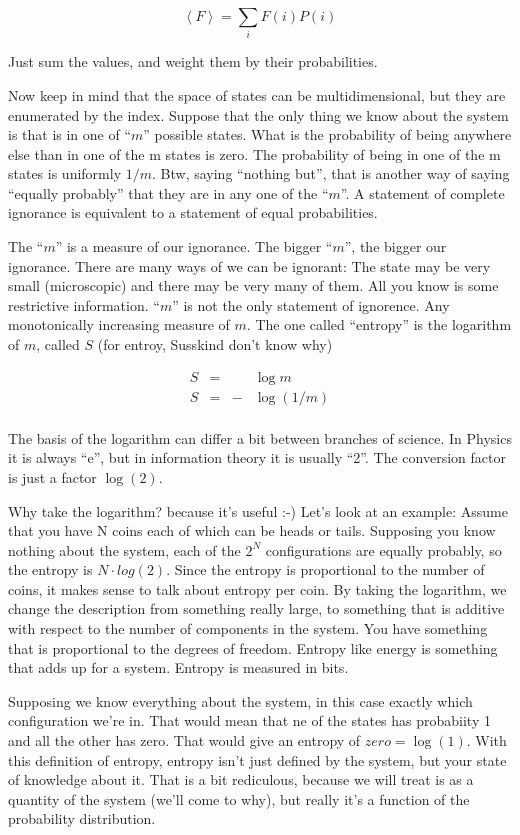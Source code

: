 \documentclass[a4, 12pt, english, USenglish]{scrreprt}
\newcommand{\ev}[1]{\ensuremath{\left\langle{}#1{}\right\rangle}}
\begin{document}
\[
  \ev{F} = \sum_i F(i) P(i)
\]

Just sum the values, and weight them by their probabilities.

Now keep in mind that the space of states can be multidimensional, but
they are enumerated by the index. Suppose that the only thing we know
about the system is that is in one of ``\(m\)'' possible states.  What is
the probability of being anywhere else than in one of the m states is
zero.   The probability of being in one of the m states is uniformly
\(1/m\).  Btw, saying ``nothing but'', that is another way of saying
``equally probably'' that they are in any one of the ``\(m\)''.  A
statement of complete ignorance is equivalent to  a statement of equal
probabilities.

The ``\(m\)'' is a measure of our ignorance. The bigger ``\(m\)'', the bigger
our ignorance.   There are many ways of we can be ignorant: The state
may be very small (microscopic)  and  there may be very many of them.
All you know is some restrictive information.   ``\(m\)'' is not the only
statement of ignorence.  Any monotonically increasing measure of \(m\).
The one called ``entropy'' is the logarithm of \(m\), called \(S\) (for
entroy, Susskind don't know why)

\[
\begin{array}{lccl}
S &=& &\log m \\
S&=& - &\log (1/m) \\
\end{array}
\]

The basis of the logarithm can differ a bit between branches of
science.  In Physics it is always ``e'', but in information theory it
is usually ``2''.  The conversion factor is just a factor \(\log(2)\).   

Why take the logarithm?  because it's useful :-)  Let's look at an
example: Assume that you have N coins each of which can be heads or
tails.  Supposing you know nothing about the system, each of the \(2^N\)
configurations are equally probably, so the entropy is \(N\cdot log(2)\).
Since the entropy is proportional to the number of coins, it makes
sense to talk about entropy per coin.  By taking the logarithm, we
change the description from something really large, to something that
is additive with respect to the number of components in the system.
You have something that is proportional to the degrees of
freedom. Entropy like energy is something that adds up for a system.
Entropy is measured in bits.

Supposing we know everything about the system, in this case exactly
which configuration we're in. That would mean that ne of the states
has probabiity 1 and all the other has zero.  That would give an
entropy of \(zero =\log(1)\).    With this definition of entropy, entropy
isn't just defined by the system, but your state of knowledge about
it.  That is a bit rediculous, because we will treat is as a quantity
of the system (we'll come to why), but really it's a function of the
probability distribution.
\end{document}

